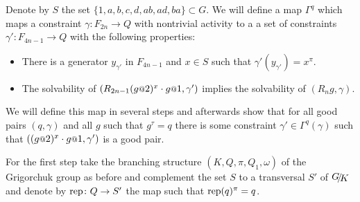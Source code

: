 \documentclass[a4paper,12pt]{article}
\begin{document}
Denote by $S$ the set $\{1,a,b,c,d,ab,ad,ba\}\subset G$.
We will define a map $\Gamma^q$ which maps a constraint $\gamma\colon F_{2n} \to Q$ with nontrivial activity to a a set of constraints $\gamma'\colon F_{4n-1}\to Q$ 
with the following properties:
\begin{itemize}
  \item There is a generator $y_{\gamma'}$ in $F_{4n-1}$ and $x\in S$ such that $\gamma'(y_{\gamma'})=x^\pi$.
  \item The solvability of $(R_{2n-1} (g\at{2})^x \cdot g\at{1},\gamma')$ implies
  the solvability of $(R_ng,\gamma)$.
 \end{itemize}

 We will define this map in several steps and afterwards show that for all good pairs $(q,\gamma)$ and all $g$ such that $g^\tau=q$ 
 there is some constraint $\gamma' \in \Gamma^q(\gamma)$ such that $((g\at{2})^x \cdot g\at{1},\gamma')$ is a good pair.
 
 For the first step take the branching structure $(K,Q,\pi,Q_1,\omega)$ of the Grigorchuk group as before and 
 complement the set $S$ to a transversal $S'$ of $\RNK{G}{K}$ and denote by $\textup{rep}\colon Q\to S'$ 
 the map such that $\textup{rep}(q)^\pi = q$.
 
\end{document}
